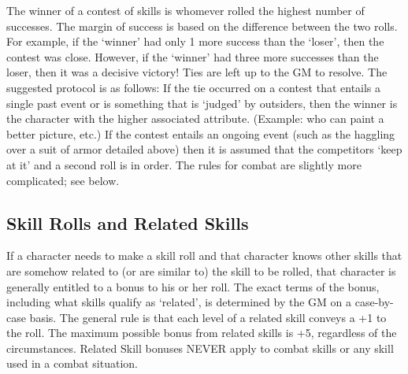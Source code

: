 \documentclass[twoside]{book}
\begin{document}
   The winner of a contest of skills is whomever rolled
               the highest number of successes. The margin of success is
               based on the difference between the two rolls. For
               example, if the `winner' had only 1 more
               success than the `loser', then the contest was
               close. However, if the `winner' had three more
               successes than the loser, then it was a decisive victory!
                Ties are left up to the GM to resolve. The suggested
               protocol is as follows:  If the tie occurred on a contest that entails a
               single past event or is something that is
               `judged' by outsiders, then the winner is the
               character with the higher associated attribute. (Example:
               who can paint a better picture, etc.)  If the contest entails an ongoing event (such as the
               haggling over a suit of armor detailed above) then it is
               assumed that the competitors `keep at it' and
               a second roll is in order.  The rules for combat are slightly more complicated;
               see below. 
\subsection{Skill Rolls and Related Skills}
     If a character needs to make a skill roll and that
               character knows other skills that are somehow related to
               (or are similar to) the skill to be rolled, that character
               is generally entitled to a bonus to his or her roll. The
               exact terms of the bonus, including what skills qualify as
               `related', is determined by the GM on a
               case-by-case basis. The general rule is that each level of
               a related skill conveys a +1 to the roll. The maximum
               possible bonus from related skills is +5, regardless of
               the circumstances. 
   Related Skill bonuses NEVER apply to combat skills
               or any skill used in a combat situation. 
\end{document}
